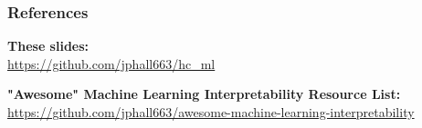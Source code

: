 \documentclass[11pt,
               aspectratio=169,
               hyperref={colorlinks}
               ]{beamer}
\begin{document}
	\begin{frame}[t, allowframebreaks]
	
		\frametitle{References}	
		
			\textbf{These slides:}\\
			\small{\url{https://github.com/jphall663/hc_ml}}
			
			\vspace{10pt}
			
			\textbf{"Awesome" Machine Learning Interpretability Resource List:}\\
			\small{\url{https://github.com/jphall663/awesome-machine-learning-interpretability}}
		
		\framebreak		
		
		\printbibliography
		
	\end{frame}
\end{document}
